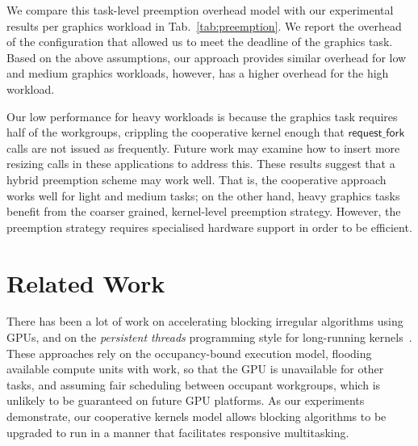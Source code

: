 \documentclass[sigconf]{acmart}
\newcommand{\mytab}{Tab.~}
\newcommand{\offerfork}{\mathsf{request\_fork}}
\begin{document}
{We compare this task-level preemption overhead model with our
experimental results per graphics workload in
\mytab{\ref{tab:preemption}}. We report the overhead of the
configuration that allowed us to meet the deadline of the graphics
task.
%
Based on the above assumptions, our approach provides similar overhead
for low and medium graphics workloads, however, has a higher overhead for
the high workload.

Our low performance for heavy workloads is because the graphics task
requires half of the workgroups, crippling the cooperative kernel
enough that $\offerfork$ calls are not issued as frequently.  Future
work may examine how to insert more resizing calls in these
applications to address this.
%
These results suggest that a hybrid preemption scheme may work
well. That is, the cooperative approach works well for light and
medium tasks; on the other hand, heavy graphics tasks benefit from the
coarser grained, kernel-level preemption strategy. However, the
preemption strategy requires specialised hardware support
in order to be efficient.

\section{Related Work}\label{sec:relatedwork}

%
There has been a lot of work on accelerating blocking irregular
algorithms using GPUs, and on the \emph{persistent threads}
programming style for long-running
kernels~\cite{owens-persistent,DBLP:conf/ipps/KaleemVPHP16,DBLP:conf/ipps/DavidsonBGO14,DBLP:conf/hipc/HarishN07,DBLP:journals/topc/MerrillGG15,DBLP:conf/egh/VineetHPN09,DBLP:conf/ppopp/NobariCKB12,DBLP:conf/hpcc/SolomonTT10a,DBLP:conf/popl/PrabhuRMH11,DBLP:conf/ppopp/Mendez-LojoBP12,DBLP:conf/oopsla/PaiP16,DBLP:conf/oopsla/SorensenDBGR16,DBLP:conf/egh/CedermanT08,TPO10,BNP12,Pannotia}.
These approaches rely on the occupancy-bound execution model, flooding
available compute units with work, so that the GPU is unavailable for
other tasks, and assuming fair scheduling between occupant workgroups,
which is unlikely to be guaranteed on future GPU platforms.
%
As our experiments demonstrate, our cooperative kernels model allows blocking algorithms
to be upgraded to run in a manner that facilitates responsive multitasking.


}
\end{document}
